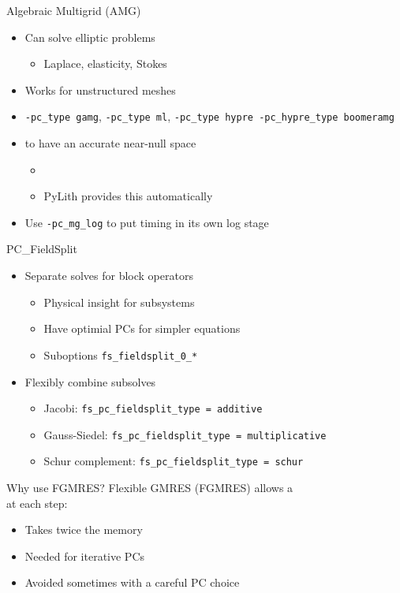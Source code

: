 \documentclass[dvipsnames]{beamer}
\begin{document}
%
\begin{frame}[fragile]{Algebraic Multigrid (AMG)}
\begin{itemize}
  \item Can solve elliptic problems
  \begin{itemize}
    \item Laplace, elasticity, Stokes
  \end{itemize}
  \medskip
  \item Works for unstructured meshes
  \medskip
  \item \verb|-pc_type gamg|,  \verb|-pc_type ml|, \verb|-pc_type hypre -pc_hypre_type boomeramg|
  \medskip
  \item {} to have an accurate near-null space
  \begin{itemize}
    \item {}
    \item PyLith provides this automatically
  \end{itemize}
  \medskip
  \item Use \verb|-pc_mg_log| to put timing in its own log stage
\end{itemize}
\end{frame}
%
\begin{frame}[fragile]{PC\_FieldSplit}
\begin{itemize}
  \item {\Large Separate solves for block operators}
  \begin{itemize}
    \item Physical insight for subsystems
    \smallskip
    \item Have optimial PCs for simpler equations
    \smallskip
    \item Suboptions \verb|fs_fieldsplit_0_*|
  \end{itemize}
  \bigskip
  \item {\Large Flexibly combine subsolves}
  \begin{itemize}
    \item Jacobi: \verb|fs_pc_fieldsplit_type = additive|
    \smallskip
    \item Gauss-Siedel: \verb|fs_pc_fieldsplit_type = multiplicative|
    \smallskip
    \item Schur complement: \verb|fs_pc_fieldsplit_type = schur|
  \end{itemize}
\end{itemize}
\end{frame}
%

%
\begin{frame}{Why use FGMRES?}\Large
Flexible GMRES (FGMRES) allows a\\
 at each step:
\medskip
\begin{itemize}
  \item Takes twice the memory
  \medskip
  \item Needed for iterative PCs
  \medskip
  \item Avoided sometimes with a careful PC choice
\end{itemize}
\end{frame}
%
%
\end{document}
